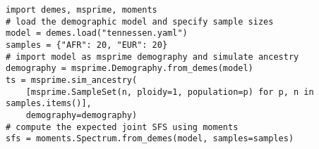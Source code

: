 \documentclass[varwidth]{standalone}
\begin{document}
\begin{verbatim}
import demes, msprime, moments
# load the demographic model and specify sample sizes
model = demes.load("tennessen.yaml")
samples = {"AFR": 20, "EUR": 20}
# import model as msprime demography and simulate ancestry
demography = msprime.Demography.from_demes(model)
ts = msprime.sim_ancestry(
    [msprime.SampleSet(n, ploidy=1, population=p) for p, n in samples.items()],
    demography=demography)
# compute the expected joint SFS using moments
sfs = moments.Spectrum.from_demes(model, samples=samples)
\end{verbatim}
\end{document}
